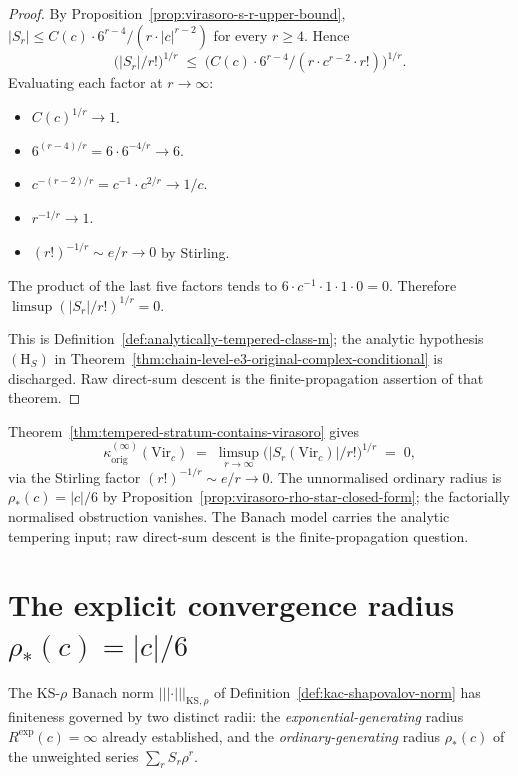\begin{proof}
By Proposition~\ref{prop:virasoro-s-r-upper-bound},
$\lvert S_r \rvert \le C(c) \cdot 6^{r-4} / (r \cdot \lvert c \rvert^{r-2})$
for every $r \ge 4$. Hence
\[
 \bigl( \lvert S_r \rvert / r! \bigr)^{1/r}
 \;\le\;
 \bigl( C(c) \cdot 6^{r-4} / (r \cdot c^{r-2} \cdot r!) \bigr)^{1/r}.
\]
Evaluating each factor at $r \to \infty$:
\begin{itemize}[nosep]
\item $C(c)^{1/r} \to 1$.
\item $6^{(r-4)/r} = 6 \cdot 6^{-4/r} \to 6$.
\item $c^{-(r-2)/r} = c^{-1} \cdot c^{2/r} \to 1/c$.
\item $r^{-1/r} \to 1$.
\item $(r!)^{-1/r} \sim e / r \to 0$ by Stirling.
\end{itemize}
The product of the last five factors tends to
$6 \cdot c^{-1} \cdot 1 \cdot 1 \cdot 0 = 0$. Therefore
$\limsup (\lvert S_r \rvert / r!)^{1/r} = 0$.

This is Definition~\ref{def:analytically-tempered-class-m}; the
analytic hypothesis $(\mathrm{H}_S)$ in
Theorem~\ref{thm:chain-level-e3-original-complex-conditional} is
discharged. Raw direct-sum descent is the finite-propagation
assertion of that theorem.
\end{proof}

\begin{remark}
\label{rem:retraction-1-over-e}
Theorem~\ref{thm:tempered-stratum-contains-virasoro} gives
\[
 \kappa^{(\infty)}_{\mathrm{orig}}(\mathrm{Vir}_c)
 \;=\;
 \limsup_{r \to \infty}
 \bigl( \lvert S_r(\mathrm{Vir}_c) \rvert / r! \bigr)^{1/r}
 \;=\;
 0,
\]
via the Stirling factor $(r!)^{-1/r}\sim e/r\to0$. The unnormalised
ordinary radius is
$\rho_*(c)=|c|/6$ by
Proposition~\ref{prop:virasoro-rho-star-closed-form}; the factorially
normalised obstruction vanishes. The Banach model carries the
analytic tempering input; raw direct-sum descent is the
finite-propagation question.
\end{remark}

\section{The explicit convergence radius $\rho_*(c) = |c|/6$}
\label{sec:rho-star-closed-form}

The KS-$\rho$ Banach norm
$\lvert\lvert\lvert \cdot \rvert\rvert\rvert_{\mathrm{KS}, \rho}$ of
Definition~\ref{def:kac-shapovalov-norm} has finiteness governed by
two distinct radii: the \emph{exponential-generating} radius
$R^{\mathrm{exp}}(c) = \infty$ already established, and the
\emph{ordinary-generating} radius $\rho_*(c)$ of the unweighted series
$\sum_r S_r \rho^r$.

